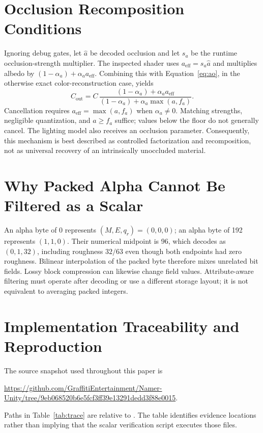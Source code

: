 \documentclass[11pt,letterpaper]{article}
\begin{document}
\section{Occlusion Recomposition Conditions}
\label{app:ao}
Ignoring debug gates, let $\widehat a$ be decoded occlusion and let $s_a$ be the runtime occlusion-strength multiplier. The inspected shader uses $a_{\mathrm{eff}}=s_a\widehat a$ and multiplies albedo by $(1-\alpha_a)+\alpha_a a_{\mathrm{eff}}$. Combining this with Equation~\eqref{eq:ao}, in the otherwise exact color-reconstruction case, yields
\begin{equation}
C_{\mathrm{out}}=C\,
\frac{(1-\alpha_a)+\alpha_a a_{\mathrm{eff}}}
     {(1-\alpha_a)+\alpha_a\max(a,f_a)}.
\end{equation}
Cancellation requires $a_{\mathrm{eff}}=\max(a,f_a)$ when $\alpha_a\ne0$. Matching strengths, negligible quantization, and $a\ge f_a$ suffice; values below the floor do not generally cancel. The lighting model also receives an occlusion parameter. Consequently, this mechanism is best described as controlled factorization and recomposition, not as universal recovery of an intrinsically unoccluded material.

\section{Why Packed Alpha Cannot Be Filtered as a Scalar}
\label{app:filter}
An alpha byte of 0 represents $(M,E,q_r)=(0,0,0)$; an alpha byte of 192 represents $(1,1,0)$. Their numerical midpoint is 96, which decodes as $(0,1,32)$, including roughness $32/63$ even though both endpoints had zero roughness. Bilinear interpolation of the packed byte therefore mixes unrelated bit fields. Lossy block compression can likewise change field values. Attribute-aware filtering must operate after decoding or use a different storage layout; it is not equivalent to averaging packed integers.

\section{Implementation Traceability and Reproduction}
\label{app:trace}
The source snapshot used throughout this paper is
\begin{center}
\small\url{https://github.com/GraffitiEntertainment/Namer-Unity/tree/9eb068520b6e5fcf3ff39e13291dedd3f88e0015}.
\end{center}
Paths in Table~\ref{tab:trace} are relative to . The table identifies evidence locations rather than implying that the scalar verification script executes those files.
\end{document}
